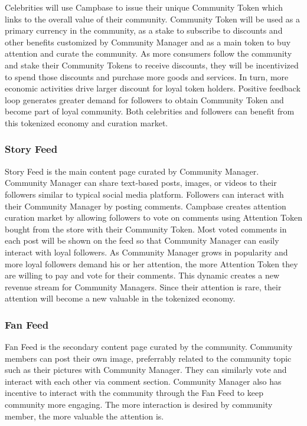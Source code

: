 \documentclass[letterpaper,11pt]{article}
\begin{document}

Celebrities will use Campbase to issue their unique Community Token which links to the overall value of their community. Community Token will be used as a primary currency in the community, as a stake to subscribe to discounts and other benefits customized by Community Manager and as a main token to buy attention and curate the community. As more consumers follow the community and stake their Community Tokens to receive discounts, they will be incentivized to spend those discounts and purchase more goods and services. In turn, more economic activities drive larger discount for loyal token holders. Positive feedback loop generates greater demand for followers to obtain Community Token and become part of loyal community. Both celebrities and followers can benefit from this tokenized economy and curation market.

\subsubsection{Story Feed}
Story Feed is the main content page curated by Community Manager. Community Manager can share text-based posts, images, or videos to their followers similar to typical social media platform. Followers can interact with their Community Manager by posting comments. Campbase creates attention curation market by allowing followers to vote on comments using Attention Token bought from the store with their Community Token. Most voted comments in each post will be shown on the feed so that Community Manager can easily interact with loyal followers. As Community Manager grows in popularity and more loyal followers demand his or her attention, the more Attention Token they are willing to pay and vote for their comments. This dynamic creates a new revenue stream for Community Managers. Since their attention is rare, their attention will become a new valuable in the tokenized economy.

\subsubsection{Fan Feed}
Fan Feed is the secondary content page curated by the community. Community members can post their own image, preferrably related to the community topic such as their pictures with Community Manager. They can similarly vote and interact with each other via comment section. Community Manager also has incentive to interact with the community through the Fan Feed to keep community more engaging. The more interaction is desired by community member, the more valuable the attention is.
\end{document}
